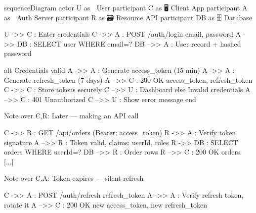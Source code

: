 \documentclass[12pt, a4paper]{article}
\begin{document}
\begin{mermaid}[
    type    = sequence,
    theme   = sunset,
    caption = {JWT authentication and token-refresh flow},
    label   = {fig:jwt},
    width   = 0.92\linewidth
]
sequenceDiagram
    actor     U  as 👤 User
    participant C  as 🖥 Client App
    participant A  as 🔐 Auth Server
    participant R  as 🗃 Resource API
    participant DB as 🗄 Database

    U  ->> C  : Enter credentials
    C  ->> A  : POST /auth/login {email, password}
    A  ->> DB : SELECT user WHERE email=?
    DB -->> A : User record + hashed password

    alt Credentials valid
        A  ->> A  : Generate access_token (15 min)
        A  ->> A  : Generate refresh_token (7 days)
        A  -->> C : 200 OK {access_token, refresh_token}
        C  ->> C  : Store tokens securely
        C  -->> U : Dashboard
    else Invalid credentials
        A  -->> C : 401 Unauthorized
        C  -->> U : Show error message
    end

    Note over C,R: Later — making an API call

    C  ->> R  : GET /api/orders (Bearer: access_token)
    R  ->> A  : Verify token signature
    A  -->> R : Token valid, claims: {userId, roles}
    R  ->> DB : SELECT orders WHERE userId=?
    DB -->> R : Order rows
    R  -->> C : 200 OK {orders: [...]}

    Note over C,A: Token expires — silent refresh

    C  ->> A  : POST /auth/refresh {refresh_token}
    A  ->> A  : Verify refresh token, rotate it
    A  -->> C : 200 OK {new access_token, new refresh_token}
\end{mermaid}
\end{document}
